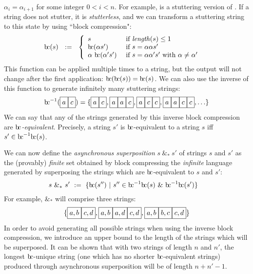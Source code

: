 \documentclass[a4paper,11pt,leqno]{article}
\newcommand{\bc}{{\rm b\!c}}
\newcommand{\vph}[1]{\vphantom{#1}}
\newcommand{\ebox}[1]{\fbox{$\vph{',}#1$}}
\newcommand{\eboxl}[1]{\fbox{$\vph{'}#1$}}
\begin{document}
$\alpha_i=\alpha_{i+1}$ for some integer $0 < i < n$. For example, 
\eboxl{a}\eboxl{a}\eboxl{a}\eboxl{c}\eboxl{c}
 is a stuttering version of 
\eboxl{a}\eboxl{c}. If 
a string does not 
stutter, it is \textit{stutterless}, and we can transform a stuttering string 
to this 
state by using ``block compression":
\begin{align}
\bc(s)  &\ \ :=\ \
\left\{ \begin{array}{ll}
s & \mbox{ if \textit{length}}(s)\leq 1 \\
\bc({\alpha}s')  & \mbox{ if } s={\alpha}{\alpha}s'\\
\alpha ~{\bc}({\alpha'}{s'})  
& \mbox{ if } s=\alpha{\alpha'}{s'} \mbox{ with } \alpha\neq\alpha'
\end{array}
\right. 
\end{align}
This function can be applied multiple times to a string, but the output will 
not change after the first application: $\bc(\bc(s)) = \bc(s)$. We can also use 
the inverse of this function to generate infinitely many stuttering strings:
\begin{align}
\bc^{-1}(\ebox{a}\ebox{c}) = 
\{ \ebox{a}\ebox{c},
\ebox{a}\ebox{a}\ebox{c},
\ebox{a}\ebox{c}\ebox{c}, 
\ebox{a}\ebox{a}\ebox{c}\ebox{c}, 
\ldots \}
\end{align}
We can say that any of the strings generated by this inverse block compression 
are \textit{$\bc{}$-equivalent}. Precisely, a string $s'$ is $\bc{}$-equivalent 
to a 
string 
$s$ iff $s' \in \bc^{-1}\bc(s)$.

We can now define the \textit{asynchronous superposition} $s~\&_*~s'$ of 
strings $s$ and 
$s'$ as the (provably) \textit{finite} set obtained by block compressing the 
\textit{infinite} 
language generated by superposing the strings which are $\bc$-equivalent to $s$ 
and $s'$:
\begin{align}
s\ \&_* \ s' & \ := \
\{\bc(s'') \ | \ s''\in \bc^{-1}\bc(s)\ \& \ \bc^{-1}\bc(s')\}
\end{align}
For example, \ebox{a}\ebox{c} $\&_*$ 
\ebox{b}\ebox{d} will comprise 
three strings:
\begin{align}
\{ \ebox{a, b}\ebox{c, d},
\ebox{a, b}\ebox{a, d}\ebox{c, d},
\ebox{a, b}\ebox{b, c}\ebox{c, d} \}
\end{align}
In order to avoid generating all possible strings when using the inverse block 
compression, we introduce an upper bound to the length of the strings which 
will be superposed. It can be shown that with two strings of length $n$ and 
$n'$, the longest $\bc$-unique string (one which has no shorter 
$\bc$-equivalent strings) produced through asynchronous superposition will be 
of length $n+n'-1$.
\end{document}
